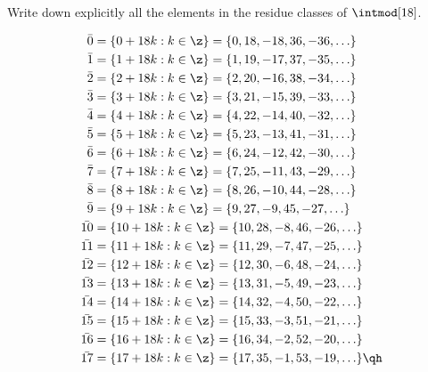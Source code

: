 \begin{problems}
    \item Write down explicitly all the elements in the residue classes of $\intmod[18]$.
    \begin{sol}
        \begin{align*}
            \bar 0 & = \{0 + 18k : k \in \z\} = \{0, 18, -18, 36, -36, \ldots\} \\
            \bar 1 & = \{1 + 18k : k \in \z\} = \{1, 19, -17, 37, -35, \ldots\} \\
            \bar 2 & = \{2 + 18k : k \in \z\} = \{2, 20, -16, 38, -34, \ldots\} \\
            \bar 3 & = \{3 + 18k : k \in \z\} = \{3, 21, -15, 39, -33, \ldots\} \\
            \bar 4 & = \{4 + 18k : k \in \z\} = \{4, 22, -14, 40, -32, \ldots\} \\
            \bar 5 & = \{5 + 18k : k \in \z\} = \{5, 23, -13, 41, -31, \ldots\} \\
            \bar 6 & = \{6 + 18k : k \in \z\} = \{6, 24, -12, 42, -30, \ldots\} \\
            \bar 7 & = \{7 + 18k : k \in \z\} = \{7, 25, -11, 43, -29, \ldots\} \\
            \bar 8 & = \{8 + 18k : k \in \z\} = \{8, 26, -10, 44, -28, \ldots\} \\
            \bar 9 & = \{9 + 18k : k \in \z\} =\{9, 27, -9, 45, -27, \ldots\} \\
            \bar{10} & = \{10 + 18k : k \in \z\} = \{10, 28, -8, 46, -26, \ldots\} \\
            \bar{11} & = \{11 + 18k : k \in \z\} = \{11, 29, -7, 47, -25, \ldots\} \\
            \bar{12} & = \{12 + 18k : k \in \z\} = \{12, 30, -6, 48, -24, \ldots\} \\
            \bar{13} & = \{13 + 18k : k \in \z\} = \{13, 31, -5, 49, -23, \ldots\} \\
            \bar{14} & = \{14 + 18k : k \in \z\} = \{14, 32, -4, 50, -22, \ldots\} \\
            \bar{15} & = \{15 + 18k : k \in \z\} = \{15, 33, -3, 51, -21, \ldots\} \\
            \bar{16} & = \{16 + 18k : k \in \z\} = \{16, 34, -2, 52, -20, \ldots\} \\
            \bar{17} & = \{17 + 18k : k \in \z\} = 
            \{17, 35, -1, 53, -19, \ldots\} \qh
        \end{align*}
    \end{sol}

\end{problems}

